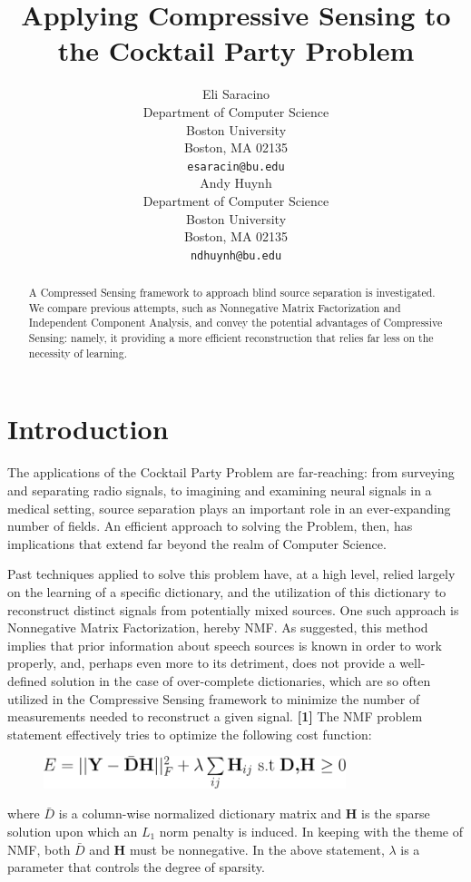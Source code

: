 \documentclass{article}
\title{Applying Compressive Sensing to the Cocktail Party Problem}
\author{
  Eli Saracino \\
  Department of Computer Science\\
  Boston University\\
  Boston, MA 02135 \\
  \texttt{esaracin@bu.edu} \\
  \And
  Andy Huynh \\
  Department of Computer Science \\
  Boston University \\
  Boston, MA 02135 \\
  \texttt{ndhuynh@bu.edu} \\
}
\begin{document}
\maketitle

\begin{abstract}
  A Compressed Sensing framework to approach blind source separation is investigated. We compare previous attempts, such as Nonnegative Matrix Factorization and Independent Component Analysis, and convey the potential advantages of Compressive Sensing: namely, it providing a more efficient reconstruction that relies far less on the necessity of learning.
\end{abstract}

\section{Introduction}
The applications of the Cocktail Party Problem are far-reaching: from surveying and separating radio signals, to imagining and examining neural signals in a medical setting, source separation plays an important role in an ever-expanding number of fields. An efficient approach to solving the Problem, then, has implications that extend far beyond the realm of Computer Science. 

Past techniques applied to solve this problem have, at a high level, relied largely on the learning of a specific dictionary, and the utilization of this dictionary to reconstruct distinct signals from potentially mixed sources. One such approach is Nonnegative Matrix Factorization, hereby NMF. As suggested, this method implies that prior information about speech sources is known in order to work properly, and, perhaps even more to its detriment, does not provide a well-defined solution in the case of over-complete dictionaries, which are so often utilized in the Compressive Sensing framework to minimize the number of measurements needed to reconstruct a given signal. \textbf{[1]} The NMF problem statement effectively tries to optimize the following cost function: 

\begin{figure}[H]
	\centering
	\includegraphics[width=250pt]{figs/NMF.png}
	\label{Nonnegative Matrix Factorization}
\end{figure}

where \textbf{$\bar{D}$} is a column-wise normalized dictionary matrix and \textbf{H} is the sparse solution upon which an $L_{1}$ norm penalty is induced. In keeping with the theme of NMF, both $\bar{D}$ and \textbf{H} must be nonnegative. In the above statement, $\lambda$ is a parameter that controls the degree of sparsity.
\end{document}
